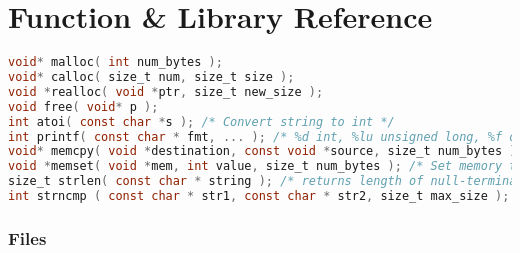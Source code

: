 \documentclass[legalpaper,10pt]{article}
\begin{document}
\section*{Function \& Library Reference}

\lstset{numbers=none}

\begin{lstlisting}[language=C]
void* malloc( int num_bytes );
void* calloc( size_t num, size_t size );
void *realloc( void *ptr, size_t new_size );
void free( void* p );
int atoi( const char *s ); /* Convert string to int */
int printf( const char * fmt, ... ); /* %d int, %lu unsigned long, %f double,  %s string, \n newline, ...=args */
void* memcpy( void *destination, const void *source, size_t num_bytes ); /* Returns destination */
void *memset( void *mem, int value, size_t num_bytes ); /* Set memory to 0 */
size_t strlen( const char * string ); /* returns length of null-terminated string, not counting the terminator */
int strncmp ( const char * str1, const char * str2, size_t max_size ); /* return 0 if strings equal */
\end{lstlisting}

\subsubsection*{Files}
\end{document}
